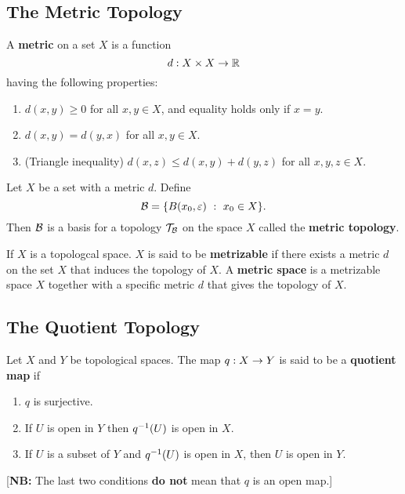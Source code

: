 \subsection{The Metric Topology}\nl
\setcounter{section}{20}
\setcounter{thm}{0}

\vs

\dfn A \textbf{metric} on a set $X$ is a function
\[d:X\times X \rightarrow \mathbb{R}\]
having the following properties:
\begin{enumerate}
    \item $d(x,y)\geq 0$ for all $x,y\in X$, and equality holds only if $x = y$.
    \item $d(x,y) = d(y,x)$ for all $x,y\in X$.
    \item (Triangle inequality) $d(x,z) \leq d(x,y) + d(y,z)$ for all $x,y,z\in X$.
\end{enumerate}

\vs


\dfn Let $X$ be a set with a metric $d$. Define
\[\mathcal{B} = \{B(x_0,\varepsilon)\ :\ x_0\in X\}.\]
Then $\mathcal{B}$ is a basis for a topology $\mathcal{T}_{\mathcal{B}}$ on the space $X$ called the \textbf{metric topology}.


\vs

\dfn If $X$ is a topologcal space. $X$ is said to be \textbf{metrizable} if there exists a metric $d$ on the set $X$ that induces the topology of $X$. A \textbf{metric space} is a metrizable space $X$ together with a specific metric $d$ that gives the topology of $X$.






\subsection{The Quotient Topology}\nl
\setcounter{section}{22}
\setcounter{thm}{0}

\vs

\dfn Let $X$ and $Y$ be topological spaces. The map $q:X\rightarrow Y$ is said to be a \textbf{quotient map} if
\begin{enumerate}
    \item $q$ is surjective.
    \item If $U$ is open in $Y$ then $q^{-1}(U)$ is open in $X$.
    \item If $U$ is a subset of $Y$ and $q^{-1}(U)$ is open in $X$, then $U$ is open in $Y$.
\end{enumerate}
\hspace{1.2em}[\textbf{NB:} The last two conditions \textbf{do not} mean that $q$ is an open map.]

